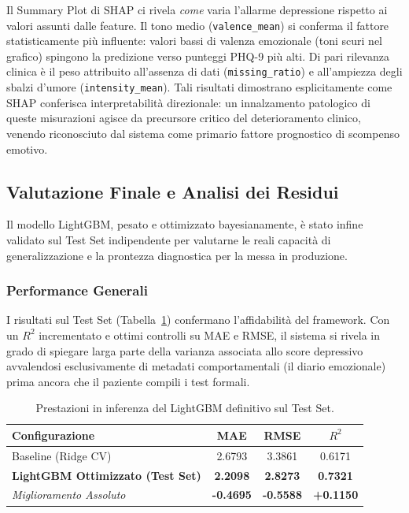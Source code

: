 Il Summary Plot di SHAP ci rivela \textit{come} varia l'allarme depressione rispetto ai valori assunti dalle feature. Il tono medio (\texttt{valence\_mean}) si conferma il fattore statisticamente più influente: valori bassi di valenza emozionale (toni scuri nel grafico) spingono la predizione verso punteggi PHQ-9 più alti. Di pari rilevanza clinica è il peso attribuito all'assenza di dati (\texttt{missing\_ratio}) e all'ampiezza degli sbalzi d'umore (\texttt{intensity\_mean}). Tali risultati dimostrano esplicitamente come SHAP conferisca interpretabilità direzionale: un innalzamento patologico di queste misurazioni agisce da precursore critico del deterioramento clinico, venendo riconosciuto dal sistema come primario fattore prognostico di scompenso emotivo.

\subsection{Valutazione Finale e Analisi dei Residui}
Il modello LightGBM, pesato e ottimizzato bayesianamente, è stato infine validato sul Test Set indipendente per valutarne le reali capacità di generalizzazione e la prontezza diagnostica per la messa in produzione.

\subsubsection*{Performance Generali}
I risultati sul Test Set (Tabella~\ref{tab:final_evaluation_metrics}) confermano l'affidabilità del framework. Con un $R^2$ incrementato e ottimi controlli su MAE e RMSE, il sistema si rivela in grado di spiegare larga parte della varianza associata allo score depressivo avvalendosi esclusivamente di metadati comportamentali (il diario emozionale) prima ancora che il paziente compili i test formali.

\begin{table}[H]
    \centering
    \begin{tabular}{|l|c|c|c|}
        \hline
        \textbf{Configurazione}                  & \textbf{MAE}     & \textbf{RMSE}    & \textbf{$R^2$}   \\
        \hline
        Baseline (Ridge CV)                      & 2.6793           & 3.3861           & 0.6171           \\
        \textbf{LightGBM Ottimizzato (Test Set)} & \textbf{2.2098}  & \textbf{2.8273}  & \textbf{0.7321}  \\
        \hline
        \textit{Miglioramento Assoluto}          & \textbf{-0.4695} & \textbf{-0.5588} & \textbf{+0.1150} \\
        \hline
    \end{tabular}
    \caption{Prestazioni in inferenza del LightGBM definitivo sul Test Set.}
    \label{tab:final_evaluation_metrics}
\end{table}

